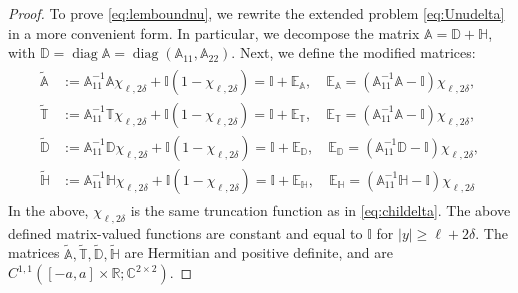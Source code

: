 \documentclass[report]{elsarticle}
\numberwithin{theorem}{section}
\renewcommand{\vec}[1]{\mathbf{#1}}
\begin{document}
\begin{proof}
To prove \eqref{eq:lemboundnu}, we rewrite the extended problem \eqref{eq:Unudelta} in a more convenient form. In particular, we decompose the matrix $\mathbb{A}=\mathbb{D}+\mathbb{H}$, with $\mathbb{D}=\operatorname{diag}\mathbb{A}=\operatorname{diag}(\mathbb{A}_{11}, \mathbb{A}_{22})$. Next, we define the modified matrices:
\begin{align}
	\label{eq:ptilde}
	\begin{split}
		\widetilde{\mathbb{A}}&:=\mathbb{A}_{11}^{-1}\mathbb{A}\chi_{\ell,2\delta}+\mathbb{I}(1-\chi_{\ell,2\delta})=\mathbb{I}+\mathbb{E}_{\mathbb{A}}, \quad \mathbb{E}_{\mathbb{A}}=(\mathbb{A}_{11}^{-1}\mathbb{A}-\mathbb{I})\chi_{\ell,2\delta},\\
		\widetilde{\mathbb{T}}&:=\mathbb{A}_{11}^{-1}\mathbb{T}\chi_{\ell,2\delta}+\mathbb{I}(1-\chi_{\ell,2\delta})=\mathbb{I}+\mathbb{E}_{\mathbb{T}}, \quad \mathbb{E}_{\mathbb{T}}=(\mathbb{A}_{11}^{-1}\mathbb{A}-\mathbb{I})\chi_{\ell,2\delta},\\
		\widetilde{\mathbb{D}}&:=\mathbb{A}_{11}^{-1}\mathbb{D}\chi_{\ell,2\delta}+\mathbb{I}(1-\chi_{\ell,2\delta})=\mathbb{I}+\mathbb{E}_{\mathbb{D}}, \quad \mathbb{E}_{\mathbb{D}}=(\mathbb{A}_{11}^{-1}\mathbb{D}-\mathbb{I})\chi_{\ell,2\delta}, \\
		\widetilde{\mathbb{H}}&:=\mathbb{A}_{11}^{-1}\mathbb{H}\chi_{\ell,2\delta}+\mathbb{I}(1-\chi_{\ell,2\delta})=\mathbb{I}+\mathbb{E}_{\mathbb{H}}, \quad \mathbb{E}_{\mathbb{H}}=(\mathbb{A}_{11}^{-1}\mathbb{H}-\mathbb{I})\chi_{\ell,2\delta}
	\end{split}
\end{align}  
In the above, $\chi_{\ell,2\delta}$ is the same truncation function as in \eqref{eq:childelta}. The above defined matrix-valued functions are constant and equal to $\mathbb{I}$ for $|y|\geq \ell+2\delta$. The matrices $\widetilde{\mathbb{A}}, \widetilde{\mathbb{T}}, \widetilde{\mathbb{D}}, \widetilde{\mathbb{H}}$ are Hermitian and positive definite, and are $C^{1,1}([-a,a]\times \mathbb{R}; \mathbb{C}^{2\times 2})$. 

\end{proof}
\end{document}
